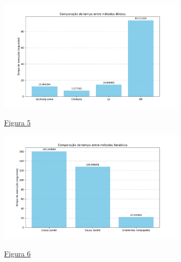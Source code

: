 \documentclass{article}
\begin{document}
    \newpage

    \hypertarget{2}{}
    \begin{figure}[ht]
        \centering
        \includegraphics[width=0.8\textwidth, trim={5px 10px 15px 25px},clip]{../figs/fig5.pdf}
        
        \hyperlink{1}{Figura 5}
    \end{figure}

    \vspace{2cm}

    \hypertarget{4}{}
    \begin{figure}[ht]
        \centering
        \includegraphics[width=0.8\textwidth, trim={5px 10px 15px 25px},clip]{../figs/fig6.pdf}
        
        \hyperlink{3}{Figura 6}
    \end{figure}

    \newpage

    \phantom{}

    \vspace{3cm}
\end{document}
